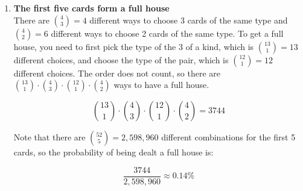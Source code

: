 {\begin{enumerate}
\begin{enumerate}
	Second draw: $ \frac{12}{51} $\\
	Third draw: $ \frac{11}{50} $\\
	Fourth draw: $ \frac{10}{49} $\\
	Fifth draw: $ \frac{9}{48} $\\
	
	Because these are independent events, we can multiply these probabilities together:
	\[ \frac{13}{52} \cdot \frac{12}{51} \cdot \frac{11}{50} \cdot \frac{10}{49} \approx 0.00018184\]
	
	So, the probability of drawing the first five cards as diamonds is approximately 0.00018184, or about 0.0182\%.
	
	\item \textbf{The first five cards form a full house}\\
	There are ${4 \choose 3} = 4$ different ways to choose 3 cards of the same type and ${4 \choose 2} = 6$ different ways to choose 2 cards of the same type. To get a full house, you need to first pick the type of the 3 of a kind, which is ${13 \choose 1} = 13$ different choices, and choose the type of the pair, which is ${12 \choose 1} = 12$ different choices. The order does not count, so there are ${13 \choose 1} \cdot {4 \choose 3} \cdot {12 \choose 1} \cdot {4 \choose 2}$ ways to have a full house.
	
	\[
	{13 \choose 1} \cdot {4 \choose 3} \cdot {12 \choose 1} \cdot {4 \choose 2} = 3744
	\]
	
	Note that there are ${52 \choose 5} = 2,598,960$ different combinations for the first 5 cards, so the probability of being dealt a full house is:
	
	\[
	\frac{3744}{2,598,960} \approx 0.14\%
	\]
	
	\end{enumerate}
	\end{enumerate}
	}

	\newpage
